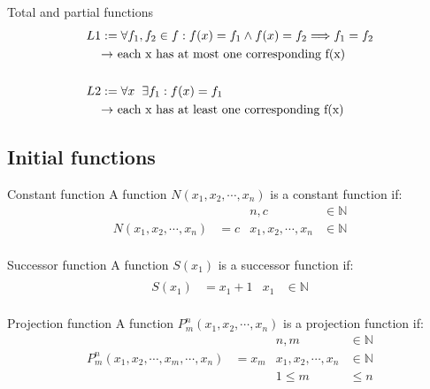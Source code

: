 \documentclass[]{beamer}
\begin{document}
\begin{frame}{Total and partial functions}
\begin{align*}
L1&:=  \forall f_1,f_2 \in f: f(x)=f_1 \wedge f(x)=f_2 \Longrightarrow f_1=f_2\\
&\text{$\rightarrow$ each x has at most one corresponding f(x)}\\
\\
L2&:= \forall x \hspace{0.2cm} \exists f_1: f(x)=f_1 \\
&\text{$\rightarrow$ each x has at least one corresponding f(x)}
\end{align*}
\end{frame}

\subsection{Initial functions}

\begin{frame}{Constant function}
A function $N(x_1,x_2,\cdots,x_n)$ is a constant function if: \\
\begin{align*}
&& n,c &\in \mathbb{N} \\
N(x_1,x_2,\cdots,x_n) &= c & x_1,x_2,\cdots,x_n &\in \mathbb{N} \\
&&&
\end{align*}
\end{frame}

\begin{frame}{Successor function}
A function $S(x_1)$ is a successor function if: \\
\begin{align*}
&&& \\
S(x_1) &= x_1+1 & x_1 &\in \mathbb{N}  \\
&&&
\end{align*}
\end{frame}

\begin{frame}{Projection function}
A function $P_m^n(x_1,x_2,\cdots,x_n)$ is a projection function if: \\
\begin{align*}
&& n,m &\in \mathbb{N} \\
P_m^n(x_1,x_2,\cdots,x_m,\cdots,x_n) &= x_m & x_1,x_2,\cdots,x_n &\in \mathbb{N}  \\
&& 1\leqslant m&\leqslant n
\end{align*}
\end{frame}
\end{document}
